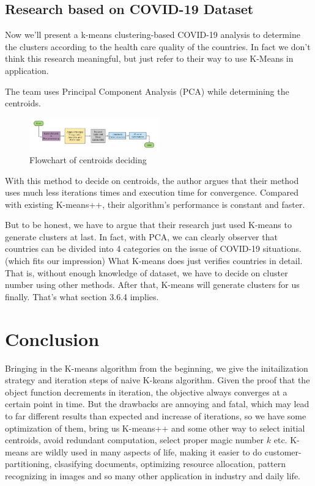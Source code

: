\documentclass[11pt]{article}
\begin{document}
\subsection{Research based on COVID-19 Dataset}
Now we'll present a k-means clustering-based COVID-19 analysis to determine the clusters according to the health care quality of the countries. In fact we don't think this research meaningful, but just refer to their way to use K-Means in application.\cite{zubair2020efficient} \par
The team uses Principal Component Analysis (PCA)  while determining the centroids.
\begin{figure}[H] %
  \centering %
  \includegraphics[width=0.5\textwidth]{COVID19.png} %
  \caption{Flowchart of centroids deciding} %
  \label{Fig.centroids} %
\end{figure}
With this method to decide on centroids, the author argues that their method uses much less iterations times and execution time for convergence. Compared with existing K-means++, their algorithm's performance is constant and faster. \par
But to be honest, we have to argue that their research just used K-means to generate clusters at last. In fact, with PCA, we can clearly observer that countries can be divided into 4 categories on the issue of COVID-19 situations.(which fits our impression) What K-means does just verifies countries in detail. That is, without enough knowledge of dataset, we have to decide on cluster number using other methods. After that, K-means will generate clusters for us finally. That's what section 3.6.4 implies.

\section{Conclusion}
Bringing in the K-means algorithm from the beginning, we give the initailization strategy and iteration steps of naive K-keans algorithm.
Given the proof that the object function decrements in iteration, the objective always converges at a certain point in time. But the drawbacks are annoying and fatal, which may lead to far different results than expected and increase of iterations, so we have some optimization of them, bring us K-means++ and some other way to select initial centroids, avoid redundant computation, select proper magic number $k$ etc.
K-means are wildly used in many aspects of life, making it easier to do customer-partitioning, clsasifying documents, optimizing resource allocation, pattern recognizing in images and so many other application in industry and daily life.
\end{document}
